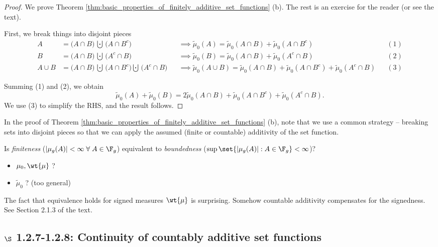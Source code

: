 \documentclass{article} %
\newcommand{\fasf}{\tilde{\mu}_0}
\newcommand{\signedmu}{\wt{\mu}}
\begin{document}
\begin{proof}
 We prove Theorem \ref{thm:basic_properties_of_finitely_additive_set_functions} (b).  The rest is an exercise for the reader (or see the text).
 
 First, we break things into disjoint pieces
 {\footnotesize 
\begin{align*}
A &= \bigg(A \cap B \bigg) \, \bigcupdot \, \bigg(A \cap B^c \bigg)	&& \implies \fasf(A) = \fasf (A \cap B) +  \fasf (A \cap B^c)  && (1) \\
B &= \bigg(A \cap B \bigg) \, \bigcupdot \, \bigg(A^c \cap B \bigg)	&& \implies \fasf(B) = \fasf (A \cap B) +  \fasf (A^c \cap B)  && (2) \\
A \cup B &= \bigg(A \cap B \bigg) \, \bigcupdot \, \bigg(A \cap B^c \bigg) \bigcupdot \, \bigg(A^c \cap B \bigg)	&& \implies \fasf(A \cup B) = \fasf (A \cap B) +  \fasf (A \cap B^c) + \fasf (A^c \cap B)   && (3) 
\end{align*}
}

Summing (1) and (2), we obtain
\[\fasf(A) + \fasf(B) = 2 \fasf(A \cap B) + \fasf(A \cap B^c) + \fasf(A^c \cap B). \]
We use (3) to simplify the RHS, and the result follows.
\end{proof}

\begin{remark}
In the proof of Theorem \ref{thm:basic_properties_of_finitely_additive_set_functions} (b), note that we use a common strategy -- breaking sets into disjoint pieces so that we can apply the assumed (finite or countable) additivity of the set function. 
\end{remark}


\begin{remark}
Is \textit{finiteness} ($|\mu_g (A)| < \infty \; \forall \; A \in \F_g$) equivalent to \textit{boundedness} ($\sup \set{|\mu_g (A)| : A \in \F_g} < \infty$)?
\begin{itemize}
\item $\mu_0, \signedmu$ ? \greencheck
\item $\fasf$ ? \redx (too general)
\end{itemize}
The fact that equivalence holds for signed measures $\signedmu$ is surprising.  Somehow countable additivity compensates for the signedness. See Section 2.1.3 of the text. 
\end{remark}


\subsection{$\S$ 1.2.7-1.2.8: Continuity of countably additive set functions}
\end{document}

